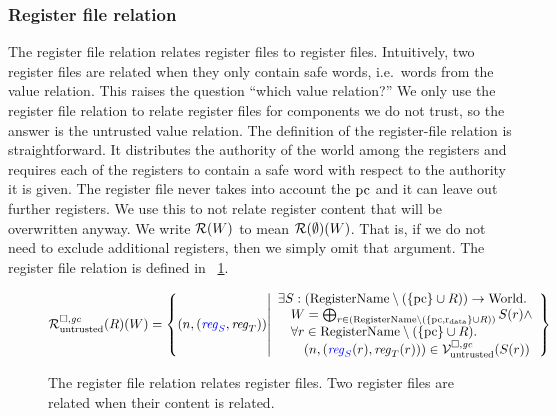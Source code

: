 \begin{jversion}
\subsubsection{Register file relation}
The register file relation relates \srccm{} register files to \trgcm{} register files.
Intuitively, two register files are related when they only contain safe words, i.e.\ words from the value relation.
This raises the question ``which value relation?''
We only use the register file relation to relate register files for components we do not trust, so the answer is the untrusted value relation.
The definition of the register-file relation is straightforward.
It distributes the authority of the world among the registers and requires each of the registers to contain a safe word with respect to the authority it is given.
The register file never takes into account the $\mathrm{pc}$ and it can leave out further registers.
We use this to not relate register content that will be overwritten anyway.
We write $\mathcal{R}(W)$ to mean $\mathcal{R}(\emptyset)(W)$.
That is, if we do not need to exclude additional registers, then we simply omit that argument.
The register file relation is defined in \figurename~\ref{fig:reg-file-rel}.

\begin{figure}
  \centering
  \[
  \lrr(R)(W) = \left\{ \npair{\stpair{\reg}{\reg}} \middle|
    \begin{array}{l}
      \exists S : (\RegName \setminus (\{\pcreg \} \cup R))\fun \World \ldotp \\
      \quad W = \bigoplus_{r \in (\RegName\setminus (\{\pcreg,\rdata \} \cup R))} S(r) \wedge \\
      \quad \forall r \in \RegName \setminus (\{\pcreg \} \cup R)\ldotp\\
      \qquad\npair{(\src{\reg_S}(r),\reg_T(r))} \in \lrv(S(r))
    \end{array}
            \right\}
\]
\caption{The register file relation relates register files. Two register files are related when their content is related.}
\label{fig:reg-file-rel}
\end{figure}


\end{jversion}
